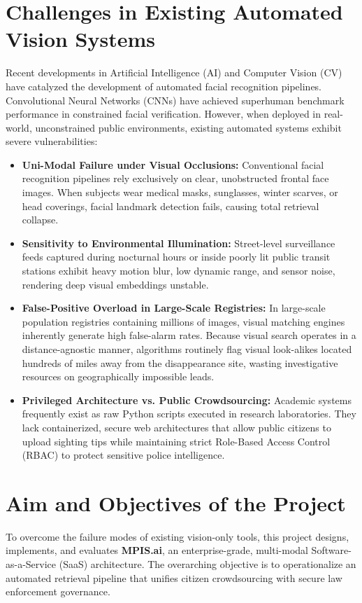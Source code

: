 \documentclass[12pt,a4paper]{report}
\begin{document}
\section{Challenges in Existing Automated Vision Systems}
Recent developments in Artificial Intelligence (AI) and Computer Vision (CV) have catalyzed the development of automated facial recognition pipelines. Convolutional Neural Networks (CNNs) have achieved superhuman benchmark performance in constrained facial verification. However, when deployed in real-world, unconstrained public environments, existing automated systems exhibit severe vulnerabilities:
\begin{itemize}
    \item \textbf{Uni-Modal Failure under Visual Occlusions:} Conventional facial recognition pipelines rely exclusively on clear, unobstructed frontal face images. When subjects wear medical masks, sunglasses, winter scarves, or head coverings, facial landmark detection fails, causing total retrieval collapse.
    \item \textbf{Sensitivity to Environmental Illumination:} Street-level surveillance feeds captured during nocturnal hours or inside poorly lit public transit stations exhibit heavy motion blur, low dynamic range, and sensor noise, rendering deep visual embeddings unstable.
    \item \textbf{False-Positive Overload in Large-Scale Registries:} In large-scale population registries containing millions of images, visual matching engines inherently generate high false-alarm rates. Because visual search operates in a distance-agnostic manner, algorithms routinely flag visual look-alikes located hundreds of miles away from the disappearance site, wasting investigative resources on geographically impossible leads.
    \item \textbf{Privileged Architecture vs. Public Crowdsourcing:} Academic systems frequently exist as raw Python scripts executed in research laboratories. They lack containerized, secure web architectures that allow public citizens to upload sighting tips while maintaining strict Role-Based Access Control (RBAC) to protect sensitive police intelligence.
\end{itemize}

\section{Aim and Objectives of the Project}
To overcome the failure modes of existing vision-only tools, this project designs, implements, and evaluates \textbf{MPIS.ai}, an enterprise-grade, multi-modal Software-as-a-Service (SaaS) architecture. The overarching objective is to operationalize an automated retrieval pipeline that unifies citizen crowdsourcing with secure law enforcement governance.
\end{document}

